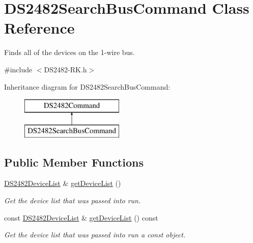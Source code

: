 \hypertarget{class_d_s2482_search_bus_command}{}\section{D\+S2482\+Search\+Bus\+Command Class Reference}
\label{class_d_s2482_search_bus_command}


Finds all of the devices on the 1-\/wire bus.  




{\ttfamily \#include $<$D\+S2482-\/\+R\+K.\+h$>$}

Inheritance diagram for D\+S2482\+Search\+Bus\+Command\+:\begin{figure}[H]
\begin{center}
\leavevmode
\includegraphics[height=2.000000cm]{class_d_s2482_search_bus_command}
\end{center}
\end{figure}
\subsection*{Public Member Functions}
\begin{DoxyCompactItemize}
\item 
\mbox{\hyperlink{class_d_s2482_device_list}{D\+S2482\+Device\+List}} \& \mbox{\hyperlink{class_d_s2482_search_bus_command_acf9ce76a212b1a927180ba4391a90f54}{get\+Device\+List}} ()
\begin{DoxyCompactList}\small\item\em Get the device list that was passed into run. \end{DoxyCompactList}\item 
\mbox{\label{class_d_s2482_search_bus_command_a7425f532612d42aa2685597085f8a27f}} 
const \mbox{\hyperlink{class_d_s2482_device_list}{D\+S2482\+Device\+List}} \& \mbox{\hyperlink{class_d_s2482_search_bus_command_a7425f532612d42aa2685597085f8a27f}{get\+Device\+List}} () const
\begin{DoxyCompactList}\small\item\em Get the device list that was passed into run a const object. \end{DoxyCompactList}\end{DoxyCompactItemize}

